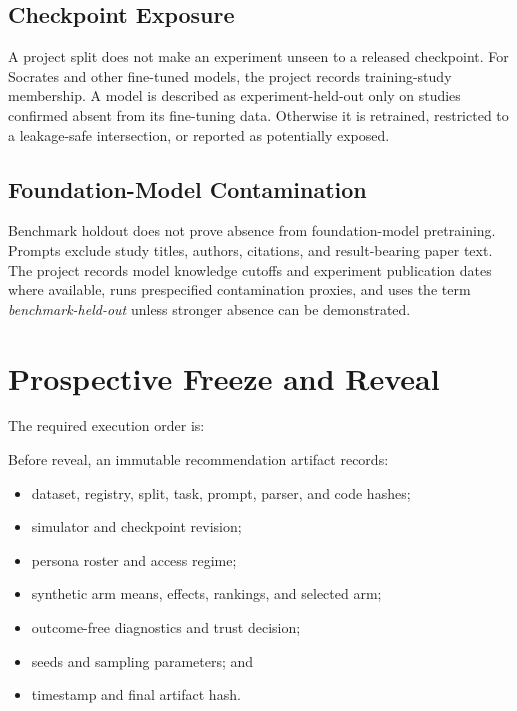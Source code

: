 \documentclass[11pt]{article}
\begin{document}
\subsection{Checkpoint Exposure}

A project split does not make an experiment unseen to a released checkpoint. For Socrates and other fine-tuned models, the project records training-study membership. A model is described as experiment-held-out only on studies confirmed absent from its fine-tuning data. Otherwise it is retrained, restricted to a leakage-safe intersection, or reported as potentially exposed.

\subsection{Foundation-Model Contamination}

Benchmark holdout does not prove absence from foundation-model pretraining. Prompts exclude study titles, authors, citations, and result-bearing paper text. The project records model knowledge cutoffs and experiment publication dates where available, runs prespecified contamination proxies, and uses the term \emph{benchmark-held-out} unless stronger absence can be demonstrated.

\section{Prospective Freeze and Reveal}

The required execution order is:

\begin{center}
\end{center}

Before reveal, an immutable recommendation artifact records:

\begin{itemize}
\item dataset, registry, split, task, prompt, parser, and code hashes;
\item simulator and checkpoint revision;
\item persona roster and access regime;
\item synthetic arm means, effects, rankings, and selected arm;
\item outcome-free diagnostics and trust decision;
\item seeds and sampling parameters; and
\item timestamp and final artifact hash.
\end{itemize}
\end{document}
